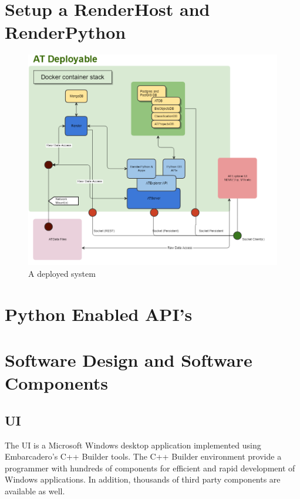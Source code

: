 \documentclass[11pt,fleqn]{book} %
\begin{document}
\begin{appendices}

\startcontents[chapter]

\chapter{Setup a RenderHost and RenderPython}
\begin{figure}[h]
\centering\includegraphics[scale=0.50]{ATDeployable_1}
\caption{A deployed system}
\end{figure}

\chapter{Python Enabled API's}

\chapter{Software Design and Software Components}

\section{\ate UI}
The \ate UI is a Microsoft Windows desktop application implemented using Embarcadero's C++ Builder tools. 
The C++ Builder environment provide a programmer with hundreds of components for efficient and rapid development of Windows applications. 
In addition, thousands of third party components are available as well.


\end{appendices}
\end{document}
